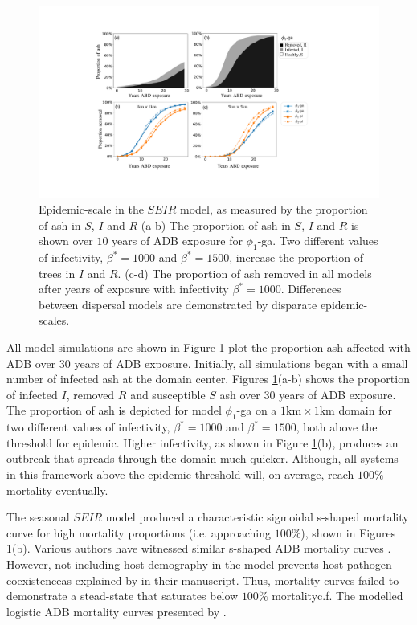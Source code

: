 \begin{figure}
    \centering
    \includegraphics[scale=0.42]{chapter6/figures/fig6-mortality.pdf}
    \caption{Epidemic-scale in the $SEIR$ model, as measured by the proportion of ash in $S$, $I$ and $R$ (a-b) The proportion of ash in $S$, $I$ and $R$ is shown over $10$ years of ADB exposure for $\phi_1$-ga. Two different values of infectivity, $\beta^*=1000$ and $\beta^*=1500$, increase the proportion of trees in $I$ and $R$. (c-d) The proportion of ash removed in all models after years of exposure with infectivity $\beta^*=1000$. Differences between dispersal models are demonstrated by disparate epidemic-scales.}
    \label{fig:ash-mortalty}
\end{figure}

All model simulations are shown in Figure \ref{fig:ash-mortalty} plot the proportion ash affected with ADB over $30$ years of ADB exposure.
Initially, all simulations began with a small number of infected ash at the domain center.
Figures \ref{fig:ash-mortalty}(a-b) shows the proportion of infected $I$, removed $R$ and susceptible $S$ ash over $30$ years of ADB exposure.
The proportion of ash is depicted for model $\phi_1$-ga on a $1\mathrm{km}\times 1 \mathrm{km}$ domain for two different values of infectivity, $\beta^*=1000$ and $\beta^*=1500$, both above the threshold for epidemic.
Higher infectivity, as shown in Figure \ref{fig:ash-mortalty}(b), produces an outbreak that spreads through the domain much quicker.
Although, all systems in this framework above the epidemic threshold will, on average, reach $100\%$ mortality eventually.

The seasonal $SEIR$ model produced a characteristic sigmoidal s-shaped mortality curve for high mortality proportions (i.e. approaching $100\%$), shown in Figures \ref{fig:ash-mortalty}(b).
Various authors have witnessed similar s-shaped ADB mortality curves \cite{https://doi.org/10.1002/ppp3.11, lohmus2014ash}.
However, not including host demography in the model prevents host-pathogen coexistence\textemdash as explained by \cite{time-varying-infectivity} in their manuscript.
Thus, mortality curves failed to demonstrate a stead-state that saturates below $100\%$ mortality\textemdash c.f. The modelled logistic ADB mortality curves presented by \cite{https://doi.org/10.1002/ppp3.11}.

